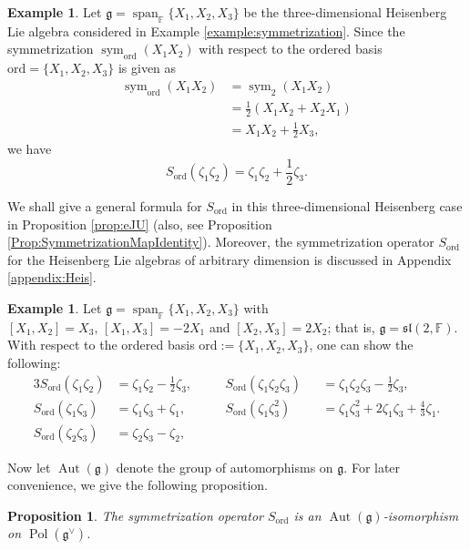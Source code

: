 \documentclass[a4paper,11pt,reqno]{amsart}
\newcommand{\frakg}{\mathfrak{g}}
\newcommand{\0}{{\bf 0}}
\newcommand{\F}{\mathbb{F}}
\newcommand{\1}{{\bf 1}}
\DeclareMathOperator{\Span}{span}
\DeclareMathOperator{\Pol}{Pol}
\newcommand{\ord}{{\mathrm{ord}}}
\newcommand{\fraksl}{{\mathfrak{sl}}}
\DeclareMathOperator{\sym}{sym}
\DeclareMathOperator{\Aut}{Aut}
\theoremstyle{plain}
\newtheorem{proposition}[equation]{Proposition}
\theoremstyle{definition}
\newtheorem{example}[equation]{Example}
\numberwithin{equation}{section}
\theoremstyle{definition}
\begin{document}
\begin{example}
Let $\mathfrak{g}=\Span_\F\{X_1, X_2, X_3\}$ 
be the three-dimensional Heisenberg Lie algebra considered 
in Example \ref{example:symmetrization}.
Since the symmetrization $\sym_\ord(X_1 X_2)$
with respect to the ordered basis $\ord=\{X_1, X_2, X_3\}$
is given as
\begin{align*}
\sym_\ord(X_1 X_2)
&=\sym_2(X_1 X_2) \\
&=\frac{1}{2}(X_1 X_2 + X_2 X_1) \\
&= X_1X_2 +\frac{1}{2}X_3,
\end{align*}
we have
\begin{equation*}
S_{\ord}(\zeta_1 \zeta_2) 
= \zeta_1\zeta_2 + \frac{1}{2}\zeta_3.
\end{equation*}

We shall give a general formula for $S_{\ord}$
in this three-dimensional Heisenberg case in Proposition \ref{prop:eJU} (also, see
Proposition \ref{Prop:SymmetrizationMapIdentity}).
Moreover, the symmetrization operator $S_{\ord}$ 
for the Heisenberg Lie algebras of arbitrary dimension is discussed in
Appendix \ref{appendix:Heis}.
\end{example}

\begin{example}
Let $\mathfrak{g}=\Span_\F\{X_1, X_2, X_3\}$ with $[X_1,X_2] = X_3,\, [X_1,X_3]=-2X_1$ and $[X_2,X_3]=2X_2$; that is, $\mathfrak{g} = \fraksl(2,\F)$.
With respect to the ordered basis $\ord:=\{X_1, X_2, X_3\}$, one can show the following:
\begin{alignat*}{3}
S_{\ord}(\zeta_1 \zeta_2) 
&= \zeta_1\zeta_2 - \frac{1}{2}\zeta_3,
\quad
&&S_{\ord}(\zeta_1\zeta_2\zeta_3) 
&&= \zeta_1\zeta_2\zeta_3 - \frac{1}{2}\zeta_3,\\
S_{\ord}(\zeta_1 \zeta_3) 
&= \zeta_1\zeta_3 + \zeta_1,
\quad
&&S_{\ord}(\zeta_1\zeta_3^2) 
&&= \zeta_1\zeta_3^2 + 2\zeta_1\zeta_3 + \frac{4}{3}\zeta_1.
\\
S_{\ord}(\zeta_2 \zeta_3) 
&= \zeta_2\zeta_3 - \zeta_2,
\end{alignat*}
\end{example}

Now let $\Aut(\frakg)$ denote the group of automorphisms
on $\frakg$. For later convenience, we give the following proposition.

\begin{proposition}\label{prop:G_orderization}
The symmetrization operator $S_{\ord}$ 
is an $\Aut(\frakg)$-isomorphism on $\Pol(\frakg^\vee)$.
\end{proposition}
\end{document}
